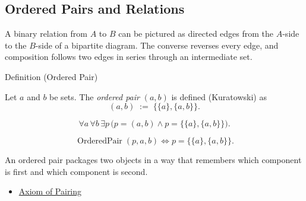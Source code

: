 
\subsection{Ordered Pairs and Relations}


\begin{remark*}
A binary relation from $A$ to $B$ can be pictured as directed edges from the
$A$-side to the $B$-side of a bipartite diagram. The converse reverses every
edge, and composition follows two edges in series through an intermediate set.
\end{remark*}

\begin{definitionbox}{Definition (Ordered Pair)}
\begin{definition}\label{def:ordered-pair}
Let $a$ and $b$ be sets. The \emph{ordered pair} $(a,b)$ is defined (Kuratowski)
as
\[
(a,b) \;:=\; \{\{a\}, \{a,b\}\}.
\]
\end{definition}
\end{definitionbox}

\begin{remark*}
\[
  \forall a\,\forall b\,\exists p\,
  \bigl(p=(a,b)\wedge p=\{\{a\},\{a,b\}\}\bigr).
\]
\end{remark*}

\begin{remark*}
\[
  \operatorname{OrderedPair}(p,a,b)
  \iff
  p=\{\{a\},\{a,b\}\}.
\]
\end{remark*}

\begin{remark*}[Interpretation]
An ordered pair packages two objects in a way that remembers which component
is first and which component is second.
\end{remark*}

\begin{dependencies}
\begin{itemize}
  \item \hyperref[ax:pairing]{Axiom of Pairing}
\end{itemize}
\end{dependencies}

